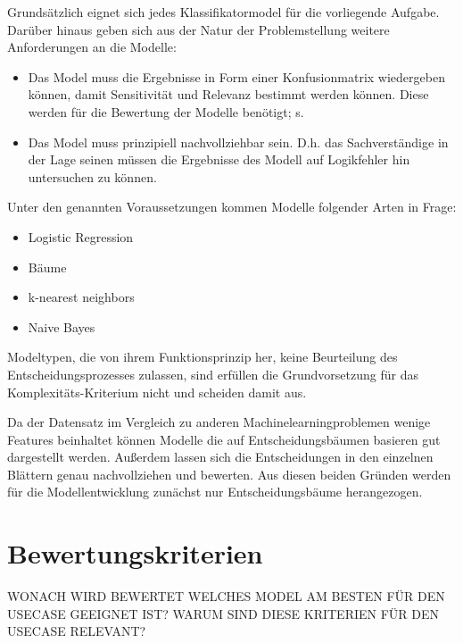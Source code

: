 Grundsätzlich eignet sich jedes Klassifikatormodel für die vorliegende Aufgabe. Darüber hinaus geben sich aus der Natur der Problemstellung weitere Anforderungen an die Modelle:

\begin{itemize}
    \item Das Model muss die Ergebnisse in Form einer Konfusionmatrix wiedergeben können, damit Sensitivität und Relevanz bestimmt werden können.  Diese werden für die Bewertung der Modelle benötigt; s. 
    \item Das Model muss prinzipiell nachvollziehbar sein. D.h. das Sachverständige in der Lage seinen müssen die Ergebnisse des Modell auf Logikfehler hin untersuchen zu können. 
\end{itemize}

Unter den genannten Voraussetzungen kommen Modelle folgender Arten in Frage:
\begin{itemize}
    \item Logistic Regression
    \item Bäume
    \item k-nearest neighbors
    \item Naive Bayes
\end{itemize}

Modeltypen, die von ihrem Funktionsprinzip her, keine Beurteilung des Entscheidungsprozesses zulassen, sind erfüllen die Grundvorsetzung für das Komplexitäts-Kriterium nicht und scheiden damit aus.

Da der Datensatz im Vergleich zu anderen Machinelearningproblemen wenige Features beinhaltet  können Modelle die auf Entscheidungsbäumen basieren gut dargestellt werden. Außerdem lassen sich die Entscheidungen in den einzelnen Blättern genau nachvollziehen und bewerten. Aus diesen beiden Gründen werden für die Modellentwicklung zunächst nur Entscheidungsbäume herangezogen. 

\section{Bewertungskriterien}
\label{sec:bewertungskriterien}
WONACH WIRD BEWERTET WELCHES MODEL AM BESTEN FÜR DEN USECASE GEEIGNET IST? WARUM SIND DIESE KRITERIEN FÜR DEN USECASE RELEVANT?

